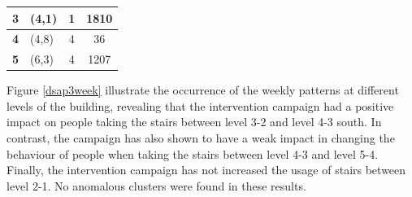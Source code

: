 \begin{table}[t]
\begin{tabular}{clcc}
\textbf{3}             & (4,1)                                                                      & 1                                                                           & 1810                                                                                    \\ \hline
\textbf{4}             & (4,8)                                                                      & 4                                                                           & 36                                                                                      \\ \hline
\textbf{5}             & (6,3)                                                                      & 4                                                                           & 1207                                                                                    \\ \hline\midrule
\end{tabular}
\end{table}

Figure \ref{dsap3week} illustrate the occurrence of the weekly patterns at different levels of the building, revealing that the intervention campaign had a positive impact on people taking the stairs between level 3-2 and level 4-3 south. In contrast, the campaign has also shown to have a weak impact in changing the behaviour of people when taking the stairs between level 4-3 and level 5-4. Finally, the intervention campaign has not increased the usage of stairs between level 2-1. No anomalous clusters were found in these results. 


